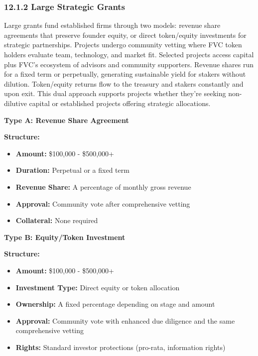\documentclass[
  paper=a4,
  ,captions=tableheading
]{scrartcl}
\providecommand{\tightlist}{%
  \setlength{\itemsep}{0pt}\setlength{\parskip}{0pt}}
\begin{document}
\subsubsection{12.1.2 Large Strategic Grants}\label{large-strategic-grants}

Large grants fund established firms through two models: revenue share
agreements that preserve founder equity, or direct token/equity
investments for strategic partnerships. Projects undergo community
vetting where FVC token holders evaluate team, technology, and market
fit. Selected projects access capital plus FVC's ecosystem of advisors
and community supporters. Revenue shares run for a fixed term or
perpetually, generating sustainable yield for stakers without dilution.
Token/equity returns flow to the treasury and stakers constantly and
upon exit. This dual approach supports projects whether they're seeking
non-dilutive capital or established projects offering strategic
allocations.

\textbf{Type A: Revenue Share Agreement}

\textbf{Structure:}

\begin{itemize}
\tightlist
\item
  \textbf{Amount:} \$100,000 - \$500,000+
\item
  \textbf{Duration:} Perpetual or a fixed term
\item
  \textbf{Revenue Share:} A percentage of monthly gross revenue
\item
  \textbf{Approval:} Community vote after comprehensive vetting
\item
  \textbf{Collateral:} None required
\end{itemize}

\textbf{Type B: Equity/Token Investment}

\textbf{Structure:}

\begin{itemize}
\tightlist
\item
  \textbf{Amount:} \$100,000 - \$500,000+
\item
  \textbf{Investment Type:} Direct equity or token allocation
\item
  \textbf{Ownership:} A fixed percentage depending on stage and amount
\item
  \textbf{Approval:} Community vote with enhanced due diligence and the
  same comprehensive vetting
\item
  \textbf{Rights:} Standard investor protections (pro-rata, information
  rights)
\end{itemize}
\end{document}
